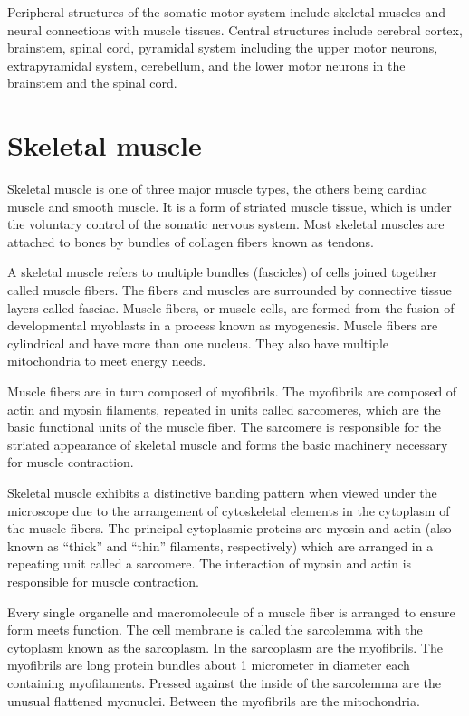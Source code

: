 Peripheral structures of the somatic motor system include skeletal muscles and neural connections with muscle tissues. Central structures include cerebral cortex, brainstem, spinal cord, pyramidal system including the upper motor neurons, extrapyramidal system, cerebellum, and the lower motor neurons in the brainstem and the spinal cord.

\hypertarget{skeletal-muscle}{%
\section{Skeletal muscle}\label{skeletal-muscle}}

Skeletal muscle is one of three major muscle types, the others being cardiac muscle and smooth muscle. It is a form of striated muscle tissue, which is under the voluntary control of the somatic nervous system. Most skeletal muscles are attached to bones by bundles of collagen fibers known as tendons.

A skeletal muscle refers to multiple bundles (fascicles) of cells joined together called muscle fibers. The fibers and muscles are surrounded by connective tissue layers called fasciae. Muscle fibers, or muscle cells, are formed from the fusion of developmental myoblasts in a process known as myogenesis. Muscle fibers are cylindrical and have more than one nucleus. They also have multiple mitochondria to meet energy needs.

Muscle fibers are in turn composed of myofibrils. The myofibrils are composed of actin and myosin filaments, repeated in units called sarcomeres, which are the basic functional units of the muscle fiber. The sarcomere is responsible for the striated appearance of skeletal muscle and forms the basic machinery necessary for muscle contraction.

Skeletal muscle exhibits a distinctive banding pattern when viewed under the microscope due to the arrangement of cytoskeletal elements in the cytoplasm of the muscle fibers. The principal cytoplasmic proteins are myosin and actin (also known as ``thick'' and ``thin'' filaments, respectively) which are arranged in a repeating unit called a sarcomere. The interaction of myosin and actin is responsible for muscle contraction.

Every single organelle and macromolecule of a muscle fiber is arranged to ensure form meets function. The cell membrane is called the sarcolemma with the cytoplasm known as the sarcoplasm. In the sarcoplasm are the myofibrils. The myofibrils are long protein bundles about 1 micrometer in diameter each containing myofilaments. Pressed against the inside of the sarcolemma are the unusual flattened myonuclei. Between the myofibrils are the mitochondria.

